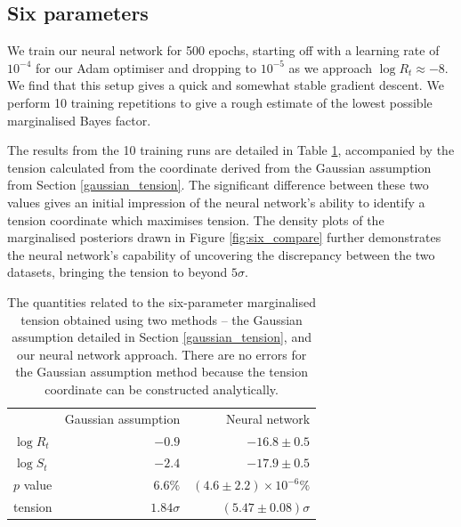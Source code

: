 \documentclass[%
 reprint,
 amsmath,amssymb,
 aps,
]{revtex4-2}
\begin{document}
\subsection{Six parameters} \label{section:six}

We train our neural network for 500 epochs, starting off with a learning rate of $10^{-4}$ for our Adam optimiser and dropping to $10^{-5}$ as we approach $\log R_t \approx -8$. We find that this setup gives a quick and somewhat stable gradient descent. We perform 10 training repetitions to give a rough estimate of the lowest possible marginalised Bayes factor.

The results from the 10 training runs are detailed in Table \ref{table:six_params}, accompanied by the tension calculated from the coordinate derived from the Gaussian assumption from Section \ref{gaussian_tension}. The significant difference between these two values gives an initial impression of the neural network's ability to identify a tension coordinate which maximises tension. The density plots of the marginalised posteriors drawn in Figure \ref{fig:six_compare} further demonstrates the neural network's capability of uncovering the discrepancy between the two datasets, bringing the tension to beyond $5\sigma$.

\begin{table}
    \begin{ruledtabular}
    \begin{tabular}{lrr}
         & Gaussian assumption & Neural network \\
        \colrule
        $\log R_t$ & $-0.9$ & $-16.8 \pm 0.5$ \\
        $\log S_t$ & $-2.4$ & $-17.9 \pm 0.5$ \\
        $p$ value & $6.6\%$ & $(4.6 \pm 2.2) \times 10^{-6}\% $ \\
        tension & $1.84\sigma$ & $(5.47 \pm 0.08)\sigma$ \\
    \end{tabular}
    \end{ruledtabular}
    \caption{The quantities related to the six-parameter marginalised tension obtained using two methods -- the Gaussian assumption detailed in Section \ref{gaussian_tension}, and our neural network approach. There are no errors for the Gaussian assumption method because the tension coordinate can be constructed analytically.}
    \label{table:six_params}
\end{table}
\end{document}
